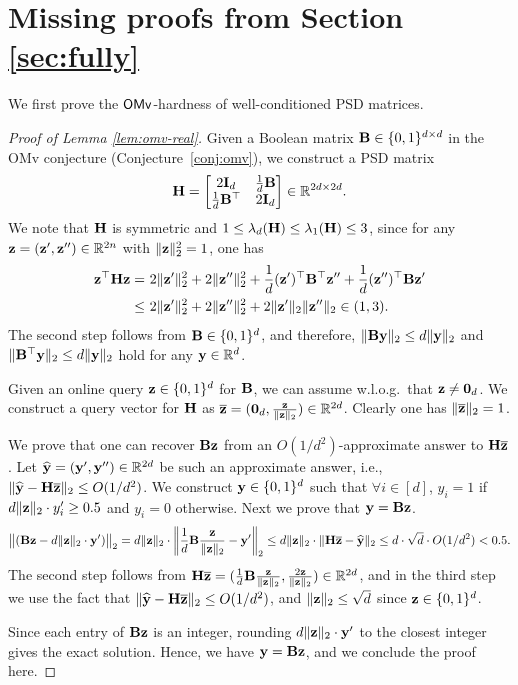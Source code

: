 \section{Missing proofs from Section \ref{sec:fully}}
\label{sec:fully-app}

We first prove the $\mathsf{OMv}$-hardness of well-conditioned PSD matrices.
\begin{proof}[Proof of Lemma \ref{lem:omv-real}]
Given a Boolean matrix $\mathbf{B} \in \{0,1\}^{d\times d}$ in the OMv conjecture (Conjecture~\ref{conj:omv}), we construct a PSD matrix 
\[
\mathbf{H} = \left[
\begin{matrix}
2\mathbf{I}_d & \frac{1}{d}\mathbf{B}\\
\frac{1}{d}\mathbf{B}^{\top} & 2 \mathbf{I}_d
\end{matrix}
\right] \in \mathbb{R}^{2d\times 2d}.
\]
We note that $\mathbf{H}$ is symmetric and $1 \leq \lambda_{d}(\mathbf{H}) \leq \lambda_1(\mathbf{H}) \leq 3$, since for any $\mathbf{z} = (\mathbf{z}', \mathbf{z}'')\in \mathbb{R}^{2n}$ with $\|\mathbf{z}\|_2^2 = 1$, one has
\begin{align*}
\mathbf{z}^{\top}\mathbf{H} \mathbf{z} = &~ 2\|\mathbf{z}'\|_2^2 + 2\|\mathbf{z}''\|_2^2 + \frac{1}{d}(\mathbf{z}')^{\top} \mathbf{B}^{\top}\mathbf{z}'' + \frac{1}{d} (\mathbf{z}'')^{\top} \mathbf{B} \mathbf{z}' \\
\leq &~ 2\|\mathbf{z}'\|_2^2 + 2\|\mathbf{z}''\|_2^2 + 2\|\mathbf{z}'\|_2\|\mathbf{z}''\|_2 \in (1, 3).
\end{align*}
The second step follows from $\mathbf{B} \in \{0,1\}^{d}$, and therefore, $\|\mathbf{B} \mathbf{y}\|_2 \leq d\|\mathbf{y}\|_2$ and $\|\mathbf{B}^{\top}\mathbf{y}\|_2\leq d\|\mathbf{y}\|_2$ hold for any $\mathbf{y} \in \mathbb{R}^{d}$.

Given an online query $\mathbf{z} \in \{0,1\}^{d}$ for $\mathbf{B}$, we can assume w.l.o.g.~that $\mathbf{z} \neq \mathbf{0}_d$. We construct a query vector for $\mathbf{H}$ as $\overline{\mathbf{z}} = (\mathbf{0}_d, \frac{\mathbf{z}}{\|\mathbf{z}\|_2}) \in \mathbb{R}^{2d}$. Clearly one has $\|\overline{\mathbf{z}}\|_2 = 1$. 

We prove that one can recover $\mathbf{B} \mathbf{z}$ from an $O(1/d^{2})$-approximate answer to $\mathbf{H} \overline{\mathbf{z}}$. Let $\widehat{\mathbf{y}} = (\mathbf{y}', \mathbf{y}'') \in \mathbb{R}^{2d}$ be such an approximate answer, i.e., $\|\widehat{\mathbf{y}} - \mathbf{H} \overline{\mathbf{z}}\|_2\leq O(1/d^{2})$. We construct $\mathbf{y} \in \{0, 1\}^{d}$ such that $\forall i \in [d]$, $y_{i} = 1$ if $d \|\mathbf{z}\|_2 \cdot y'_{i} \geq 0.5$ and $y_{i} = 0$ otherwise. Next we prove that $\mathbf{y} = \mathbf{B} \mathbf{z}$.
\[
\big\|(\mathbf{B} \mathbf{z} - d\|\mathbf{z}\|_2 \cdot \mathbf{y}')\big\|_2 = d\|\mathbf{z}\|_2\cdot\left\|\frac{1}{d}\mathbf{B}\frac{\mathbf{z}}{\|\mathbf{z}\|_2} - \mathbf{y}'\right\|_2\leq d\|\mathbf{z}\|_2\cdot \|\mathbf{H} \overline{\mathbf{z}} - \widehat{\mathbf{y}}\|_2 \leq d \cdot \sqrt{d}\cdot O(1/d^2) < 0.5.
\]
The second step follows from $\mathbf{H} \overline{\mathbf{z}} = (\frac{1}{d} \mathbf{B} \frac{\mathbf{z}}{\|\mathbf{z}\|_2}, \frac{2 \mathbf{z}}{\|\mathbf{z}\|_2}) \in \mathbb{R}^{2d}$, and in the third step we use the fact that $\|\widehat{\mathbf{y}} - \mathbf{H} \overline{\mathbf{z}}\|_2\leq O(1/d^{2})$, and $\|\mathbf{z}\|_2\leq \sqrt{d}$ since $\mathbf{z} \in \{0,1\}^d$.

Since each entry of $\mathbf{B} \mathbf{z}$ is an integer, rounding $d\|\mathbf{z}\|_2 \cdot \mathbf{y}'$ to the closest integer gives the exact solution. Hence, we have $\mathbf{y} = \mathbf{B} \mathbf{z}$, and we conclude the proof here.
\end{proof}


